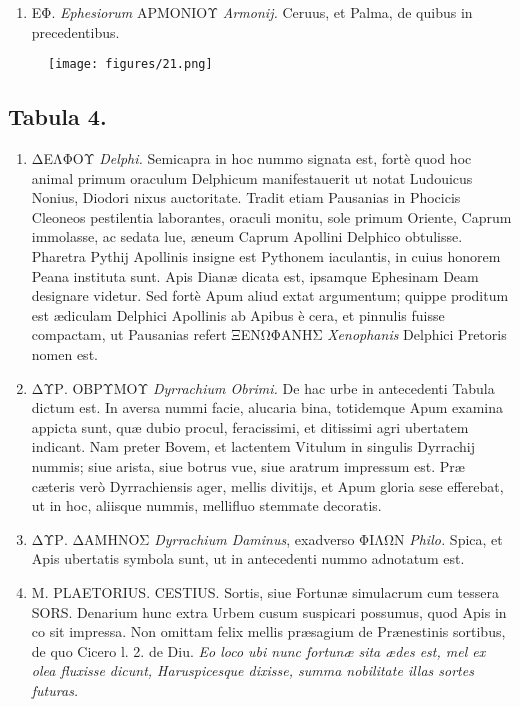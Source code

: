 \documentclass[a4paper, 11pt, oneside, polutonikogreek, latin]{article}
\begin{document}
\begin{enumerate}
    \item \foreignlanguage{greek}{ΕΦ.} \emph{Ephesiorum} \foreignlanguage{greek}{ΑΡΜΟΝΙΟΥ} \emph{Armonij.} Ceruus, et Palma, de quibus in precedentibus.
\end{enumerate}
\clearpage
\vspace*{\fill}
\begin{figure}[H]
\centering
\texttt{[image: figures/21.png]}
\end{figure}
\vspace*{\fill}
\clearpage
\subsection*{Tabula 4.}
\begin{enumerate}
    \item \foreignlanguage{greek}{ΔΕΛΦΟΥ} \emph{Delphi.} Semicapra in hoc nummo signata est, fortè quod hoc animal primum oraculum Delphicum manifestauerit ut notat Ludouicus Nonius, Diodori nixus auctoritate. Tradit etiam Pausanias in Phocicis Cleoneos pestilentia laborantes, oraculi monitu, sole primum Oriente, Caprum immolasse, ac sedata lue, æneum Caprum Apollini Delphico obtulisse. Pharetra Pythij Apollinis insigne est Pythonem iaculantis, in cuius honorem Peana instituta sunt. Apis Dianæ dicata est, ipsamque Ephesinam Deam designare videtur. Sed fortè Apum aliud extat argumentum; quippe proditum est ædiculam Delphici Apollinis ab Apibus è cera, et pinnulis fuisse compactam, ut Pausanias refert \foreignlanguage{greek}{ΞΕΝΩΦΑΝΗΣ} \emph{Xenophanis} Delphici Pretoris nomen est.

    \item \foreignlanguage{greek}{ΔΥΡ. ΟΒΡΥΜΟΥ} \emph{Dyrrachium Obrimi.} De hac urbe in antecedenti Tabula dictum est. In aversa nummi facie, alucaria bina, totidemque Apum examina appicta sunt, quæ dubio procul, feracissimi, et ditissimi agri ubertatem indicant. Nam preter Bovem, et lactentem Vitulum in singulis Dyrrachij nummis; siue arista, siue botrus vue, siue aratrum impressum est. Præ cæteris verò Dyrrachiensis ager, mellis divitijs, et Apum gloria sese efferebat, ut in hoc, aliisque nummis, mellifluo stemmate decoratis.

    \item \foreignlanguage{greek}{ΔΥΡ. ΔΑΜΗΝΟΣ} \emph{Dyrrachium Daminus}, exadverso \foreignlanguage{greek}{ΦΙΛΩΝ} \emph{Philo.} Spica, et Apis ubertatis symbola sunt, ut in antecedenti nummo adnotatum est.

    \item M. PLAETORIUS. CESTIUS. Sortis, siue Fortunæ simulacrum cum tessera SORS. Denarium hunc extra Urbem cusum suspicari possumus, quod Apis in co sit impressa. Non omittam felix mellis præsagium de Prænestinis sortibus, de quo Cicero l. 2. de Diu. \emph{Eo loco ubi nunc fortunæ sita ædes est, mel ex olea fluxisse dicunt, Haruspicesque dixisse, summa nobilitate illas sortes futuras.}


\end{enumerate}
\end{document}
